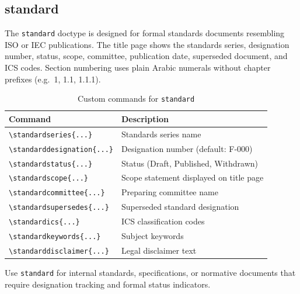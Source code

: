 \subsection{standard}

The \texttt{standard} doctype is designed for formal standards documents
resembling ISO or IEC publications.  The title page shows the standards
series, designation number, status, scope, committee, publication date,
superseded document, and ICS codes.  Section numbering uses plain Arabic
numerals without chapter prefixes (e.g.\ 1, 1.1, 1.1.1).

\begin{table}[htbp]
    \centering
    \caption{Custom commands for \texttt{standard}}
    \label{tab:standard-commands}
    \begin{tabular}{@{} l p{8cm} @{}}
        \toprule
        \textbf{Command} & \textbf{Description} \\
        \midrule
        \texttt{\textbackslash standardseries\{...\}}         & Standards series name \\
        \texttt{\textbackslash standarddesignation\{...\}}    & Designation number (default: F-000) \\
        \texttt{\textbackslash standardstatus\{...\}}         & Status (Draft, Published, Withdrawn) \\
        \texttt{\textbackslash standardscope\{...\}}          & Scope statement displayed on title page \\
        \texttt{\textbackslash standardcommittee\{...\}}      & Preparing committee name \\
        \texttt{\textbackslash standardsupersedes\{...\}}     & Superseded standard designation \\
        \texttt{\textbackslash standardics\{...\}}            & ICS classification codes \\
        \texttt{\textbackslash standardkeywords\{...\}}       & Subject keywords \\
        \texttt{\textbackslash standarddisclaimer\{...\}}     & Legal disclaimer text \\
        \bottomrule
    \end{tabular}
\end{table}

Use \texttt{standard} for internal standards, specifications, or normative
documents that require designation tracking and formal status indicators.

